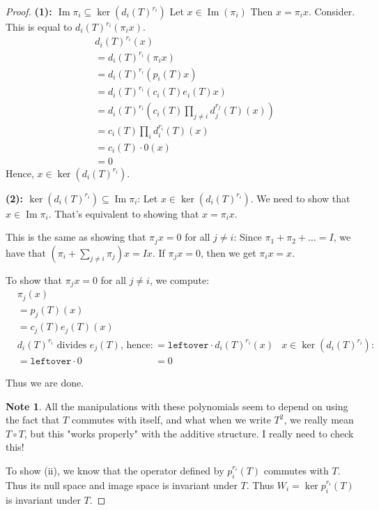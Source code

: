 \documentclass{book}
\newcommand{\im}{\operatorname{Im}}
\theoremstyle{definition}
\newtheorem{note}[theorem]{Note}
\begin{document}
\begin{proof}
\textbf{(1): $\im \pi_i \subseteq \ker (d_i(T)^{r_i})$ }
Let $x \in \im(\pi_i)$
Then $x = \pi_i x$. Consider. This
is equal to $d_i(T)^{r_i} (\pi_i x)$.
\begin{align*}
&  d_i(T)^{r_i} (x) \\
&= d_i(T)^{r_i} (\pi_i x) \\
&= d_i(T)^{r_i} (p_i(T) x) \\
&= d_i(T)^{r_i} (c_i(T)e_i(T) x) \\
&= d_i(T)^{r_i} (c_i(T)\prod_{j \neq i} d_j^{r_j}(T) (x)) \\
&= c_i(T) \prod_{i} d_i^{r_i}(T) (x) \\
&= c_i(T) \cdot 0 (x) \\
&= 0
\end{align*}
Hence, $x \in \ker (d_i(T)^{r_i})$.


\textbf{(2): $\ker (d_i(T)^{r_i}) \subseteq \im \pi_i$}:
Let $x \in \ker(d_i(T)^{r_i})$. We need to show that $x \in \im \pi_i$. That's
equivalent to showing that $x = \pi_i x$. 

This is the same as showing
that $\pi_j x = 0$ for all $j \neq i$:
Since $\pi_1 + \pi_2 + \dots = I$,
we have that $(\pi_i + \sum_{j \neq i} \pi_j) x = I x$. If $\pi_j x = 0$, then
we get $\pi_i x = x$.

To show that $\pi_j x = 0$ for all $j \neq i$, we compute:
\begin{align*}
&\pi_j(x) \\
&= p_j(T)(x) \\
&= c_j(T)e_j(T)(x) \\
&\text{$d_i(T)^{r_i}$ divides $e_j(T)$, hence:}
&= \texttt{leftover} \cdot d_i(T)^{r_i}(x)
&\text{$x \in \ker (d_i(T)^{r_i})$:} \\
&= \texttt{leftover} \cdot 0
&= 0
\end{align*}

Thus we are done.

\begin{note}
All the manipulations with these polynomials seem to depend
on using the fact that $T$ commutes with itself, and what when we
write $T^2$, we really mean $T \circ T$, but this "works properly"
with the additive structure. I really need to check this!
\end{note}

To show (ii), we know that the operator defined by $p_i^{r_i}(T)$ commutes with
$T$. Thus its null space and image space is invariant under $T$. Thus
$W_i = \ker p_i^{r_i}(T)$ is invariant under $T$.
\end{proof}
\end{document}
